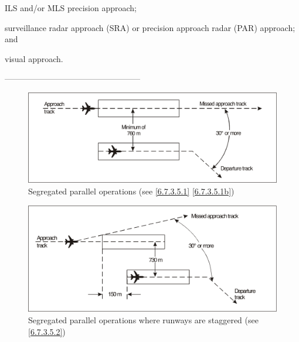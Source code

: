 \documentclass[../main.tex]{subfiles}
\begin{document}
\begin{enumerate}[itemsep=0.2cm]
\begin{enumerate}
            \begin{enumalph}
                \item ILS and/or MLS precision approach;
                \item surveillance radar approach (SRA) or precision approach radar (PAR) approach; and
                \item visual approach.
            \end{enumalph}

        \end{enumerate}
    \end{enumerate}

    \begin{center}
        \vfill
        --------------------------------------------------
        \newpage
    \end{center}

    \begin{figure}[!ht]
        \centering
        \includegraphics[width=14cm]{Images/Fig 6-1.png}
        \caption[Segregated parallel operations]{Segregated parallel operations (see \ref{6.7.3.5.1} \ref{6.7.3.5.1b})}
        \label{fig:6-1}
    \end{figure}

    \vfill
    \begin{figure}[!ht]
        \centering
        \includegraphics[width=14cm]{Images/Fig 6-2.png}
        \caption[Segregated parallel operations where runways are staggered]{Segregated parallel operations where runways are staggered (see \ref{6.7.3.5.2})}
        \label{fig:6-2}
    \end{figure}
\end{document}

